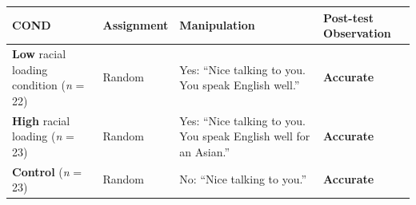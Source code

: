 \documentclass[
  english,
]{book}
\begin{document}
\begin{longtable}[]{@{}llll@{}}
\toprule
\begin{minipage}[b]{0.21\columnwidth}\raggedright
COND\strut
\end{minipage} & \begin{minipage}[b]{0.16\columnwidth}\raggedright
Assignment\strut
\end{minipage} & \begin{minipage}[b]{0.24\columnwidth}\raggedright
Manipulation\strut
\end{minipage} & \begin{minipage}[b]{0.28\columnwidth}\raggedright
Post-test Observation\strut
\end{minipage}\tabularnewline
\midrule
\endhead
\begin{minipage}[t]{0.21\columnwidth}\raggedright
\textbf{Low} racial loading condition (\emph{n} = 22)\strut
\end{minipage} & \begin{minipage}[t]{0.16\columnwidth}\raggedright
Random\strut
\end{minipage} & \begin{minipage}[t]{0.24\columnwidth}\raggedright
Yes: ``Nice talking to you. You speak English well.''\strut
\end{minipage} & \begin{minipage}[t]{0.28\columnwidth}\raggedright
\textbf{Accurate}\strut
\end{minipage}\tabularnewline
\begin{minipage}[t]{0.21\columnwidth}\raggedright
\textbf{High} racial loading (\emph{n} = 23)\strut
\end{minipage} & \begin{minipage}[t]{0.16\columnwidth}\raggedright
Random\strut
\end{minipage} & \begin{minipage}[t]{0.24\columnwidth}\raggedright
Yes: ``Nice talking to you. You speak English well for an Asian.''\strut
\end{minipage} & \begin{minipage}[t]{0.28\columnwidth}\raggedright
\textbf{Accurate}\strut
\end{minipage}\tabularnewline
\begin{minipage}[t]{0.21\columnwidth}\raggedright
\textbf{Control} (\emph{n} = 23)\strut
\end{minipage} & \begin{minipage}[t]{0.16\columnwidth}\raggedright
Random\strut
\end{minipage} & \begin{minipage}[t]{0.24\columnwidth}\raggedright
No: ``Nice talking to you.''\strut
\end{minipage} & \begin{minipage}[t]{0.28\columnwidth}\raggedright
\textbf{Accurate}\strut
\end{minipage}\tabularnewline
\bottomrule
\end{longtable}
\end{document}
